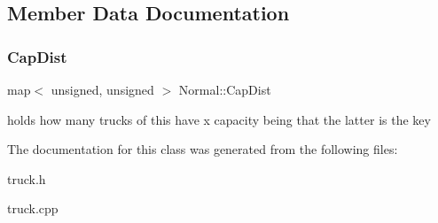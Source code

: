 \subsection{Member Data Documentation}
\mbox{\label{class_normal_a1ccae0db66db16a387c05009bf7194f8}} 
\subsubsection{\texorpdfstring{Cap\+Dist}{CapDist}}
{\footnotesize\ttfamily map$<$ unsigned, unsigned $>$ Normal\+::\+Cap\+Dist\hspace{0.3cm}{\ttfamily [static]}}

holds how many trucks of this have x capacity being that the latter is the key 

The documentation for this class was generated from the following files\+:\begin{DoxyCompactItemize}
\item 
truck.\+h\item 
truck.\+cpp\end{DoxyCompactItemize}
